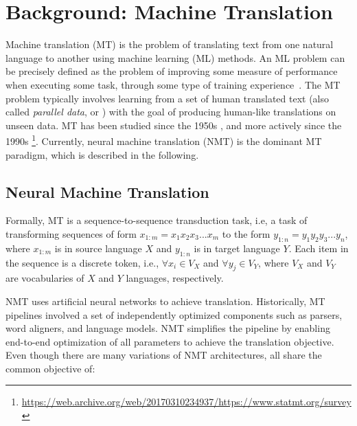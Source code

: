 \chapter{Background: Machine Translation}
\label{ch:ml-background}

Machine translation (MT) is the problem of translating text from one natural language to another using machine learning (ML) methods. 
An ML problem can be precisely defined as the problem of improving some measure of performance when executing some task, through some type of training experience~\cite{mitchell2017key}.
The MT problem typically involves learning from a set of human translated text (also called \textit{parallel data}, or ) with the goal of producing human-like translations on unseen data.
MT has been studied since the 1950s \cite{reifler1954first-cmt}, and more actively since the 1990s \cite{brown-etal-1988-statistical,brown-etal-1993-mathematics,knight1999statMT-tutorial}\footnote{\url{https://web.archive.org/web/20170310234937/https://www.statmt.org/survey}}.
Currently, neural machine translation (NMT) \cite{sutskever2014seq2seq,vaswani-2017-attention} is the dominant MT paradigm, which is described in the following.



\section{Neural Machine Translation}

Formally, MT is a sequence-to-sequence transduction task, i.e, a task of transforming sequences of form $x_{1:m} = x_1 x_2 x_3 ... x_m$ to the form $y_{1:n} = y_1 y_2 y_3 ... y_n$, where $x_{1:m}$ is in source language $X$ and $y_{1:n}$ is in target language $Y$. 
Each item in the sequence is a discrete token, i.e., $\forall x_i \in V_X $ and $\forall y_j \in V_Y$,  where $V_X$ and $V_Y$ are vocabularies of $X$ and $Y$ languages, respectively.


NMT uses artificial neural networks to achieve translation. 
Historically, MT pipelines involved a set of independently optimized components such as parsers, word aligners, and language models.
NMT simplifies the pipeline by enabling end-to-end optimization of all parameters to achieve the translation objective. 
Even though there are many variations of NMT architectures, all share the common objective of:

